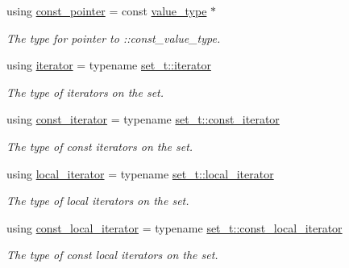 \begin{DoxyCompactItemize}
using \hyperlink{group__Types_ga3d079442c0e215d47f0c93f05b2ddb1f}{const\-\_\-pointer} = const \hyperlink{group__Types_ga56832ea0d8218bf22f59a2e8ff4de499}{value\-\_\-type} $\ast$
\begin{DoxyCompactList}\small\item\em The type for pointer to \-::const\-\_\-value\-\_\-type. \end{DoxyCompactList}\item 
using \hyperlink{group__Types_gadbad50ac069a38bd820c0a9f532f903e}{iterator} = typename \hyperlink{classshad_1_1Set_a726ddfe3c1c55db2ef60c5c1960d6666}{set\-\_\-t\-::iterator}
\begin{DoxyCompactList}\small\item\em The type of iterators on the set. \end{DoxyCompactList}\item 
using \hyperlink{group__Types_ga074f67d0516c3a68d8c79976aef62fb1}{const\-\_\-iterator} = typename \hyperlink{classshad_1_1Set_a0b2608f92f5397a25e62fad925fc177e}{set\-\_\-t\-::const\-\_\-iterator}
\begin{DoxyCompactList}\small\item\em The type of const iterators on the set. \end{DoxyCompactList}\item 
using \hyperlink{group__Types_gae1ee2e5ce1b39afa3cb1ce248747324d}{local\-\_\-iterator} = typename \hyperlink{classshad_1_1Set_a12ce7d6fd8fd0569035b0eb236b22179}{set\-\_\-t\-::local\-\_\-iterator}
\begin{DoxyCompactList}\small\item\em The type of local iterators on the set. \end{DoxyCompactList}\item 
using \hyperlink{group__Types_gac14878d16fabddc52f8dd35465f3155e}{const\-\_\-local\-\_\-iterator} = typename \hyperlink{classshad_1_1Set_a0857d9ce7a249e860e3a67bc18f7de8b}{set\-\_\-t\-::const\-\_\-local\-\_\-iterator}
\begin{DoxyCompactList}\small\item\em The type of const local iterators on the set. \end{DoxyCompactList}\end{DoxyCompactItemize}
